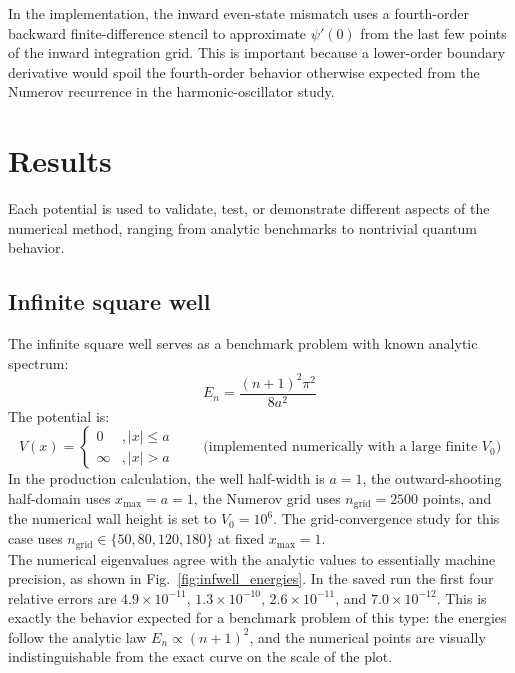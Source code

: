 \documentclass[11pt]{article}
\begin{document}
\begin{refsection}
            In the implementation, the inward even-state mismatch uses a fourth-order backward finite-difference stencil to approximate $\psi'(0)$ from the last few points of the inward integration grid. This is important because a lower-order boundary derivative would spoil the fourth-order behavior otherwise expected from the Numerov recurrence in the harmonic-oscillator study.

    \section{Results}
        Each potential is used to validate, test, or demonstrate different aspects of the numerical method, ranging from analytic benchmarks to nontrivial quantum behavior.

        \subsection{Infinite square well}
            The infinite square well serves as a benchmark problem with known analytic spectrum:
            \begin{equation}
            E_n = \frac{(n+1)^2\pi^2}{8a^2}
            \end{equation}
            The potential is:
            \begin{equation}
            V(x)=\begin{cases}
            0 & ,|x|\le a\\
            \infty & ,|x|>a
            \end{cases}
            \qquad \text{(implemented numerically with a large finite }V_0\text{)}
            \end{equation}
            In the production calculation, the well half-width is $a=1$, the outward-shooting half-domain uses $x_{\max}=a=1$, the Numerov grid uses $n_{\text{grid}}=2500$ points, and the numerical wall height is set to $V_0=10^6$. The grid-convergence study for this case uses $n_{\text{grid}}\in\{50,80,120,180\}$ at fixed $x_{\max}=1$. \\

            The numerical eigenvalues agree with the analytic values to essentially machine precision, as shown in Fig.~\ref{fig:infwell_energies}. In the saved run the first four relative errors are $4.9\times10^{-11}$, $1.3\times10^{-10}$, $2.6\times10^{-11}$, and $7.0\times10^{-12}$. This is exactly the behavior expected for a benchmark problem of this type: the energies follow the analytic law $E_n \propto (n+1)^2$, and the numerical points are visually indistinguishable from the exact curve on the scale of the plot. \\


\end{refsection}
\end{document}
